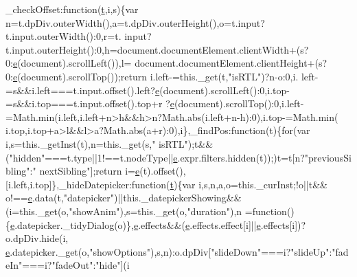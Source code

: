 \begin{DoxyCode}
      \_checkOffset:\textcolor{keyword}{function}(\hyperlink{jquery-2_80_83_8min_8js_aaccc9105df5383111407fd5b41255e23}{t},i,s)\{var n=t.dpDiv.outerWidth(),a=t.dpDiv.outerHeight(),o=t.input?t.input.outerWidth():0,r=t.
      input?t.input.outerHeight():0,h=document.documentElement.clientWidth+(s?0:\hyperlink{jquery-ui_8min_8js_a2c038346d47955cbe2cb91e338edd7e1}{e}(document).scrollLeft()),l=
      document.documentElement.clientHeight+(s?0:\hyperlink{jquery-ui_8min_8js_a2c038346d47955cbe2cb91e338edd7e1}{e}(document).scrollTop());\textcolor{keywordflow}{return} i.left-=this.\_get(t,\textcolor{stringliteral}{"isRTL"})?n-o:0,i.
      left-=s&&i.left===t.input.offset().left?\hyperlink{jquery-ui_8min_8js_a2c038346d47955cbe2cb91e338edd7e1}{e}(document).scrollLeft():0,i.top-=s&&i.top===t.input.offset().top+r
      ?\hyperlink{jquery-ui_8min_8js_a2c038346d47955cbe2cb91e338edd7e1}{e}(document).scrollTop():0,i.left-=Math.min(i.left,i.left+n>h&&h>n?Math.abs(i.left+n-h):0),i.top-=Math.min(
      i.top,i.top+a>l&&l>a?Math.abs(a+r):0),i\},\_findPos:\textcolor{keyword}{function}(t)\{\textcolor{keywordflow}{for}(var i,s=this.\_getInst(t),n=this.\_get(s,\textcolor{stringliteral}{"
      isRTL"});t&&(\textcolor{stringliteral}{"hidden"}===t.type||1!==t.nodeType||\hyperlink{jquery-ui_8min_8js_a2c038346d47955cbe2cb91e338edd7e1}{e}.expr.filters.hidden(t));)t=t[n?\textcolor{stringliteral}{"previousSibling"}:\textcolor{stringliteral}{"
      nextSibling"}];\textcolor{keywordflow}{return} i=\hyperlink{jquery-ui_8min_8js_a2c038346d47955cbe2cb91e338edd7e1}{e}(t).offset(),[i.left,i.top]\},\_hideDatepicker:\textcolor{keyword}{function}(\hyperlink{jquery-2_80_83_8min_8js_aaccc9105df5383111407fd5b41255e23}{t})\{var i,s,n,a,o=this.\_curInst;!o||t&&
      o!==\hyperlink{jquery-ui_8min_8js_a2c038346d47955cbe2cb91e338edd7e1}{e}.data(t,\textcolor{stringliteral}{"datepicker"})||this.\_datepickerShowing&&(i=this.\_get(o,\textcolor{stringliteral}{"showAnim"}),s=this.\_get(o,\textcolor{stringliteral}{"duration"}),n
      =\textcolor{keyword}{function}()\{\hyperlink{jquery-ui_8min_8js_a2c038346d47955cbe2cb91e338edd7e1}{e}.datepicker.\_tidyDialog(o)\},\hyperlink{jquery-ui_8min_8js_a2c038346d47955cbe2cb91e338edd7e1}{e}.effects&&(\hyperlink{jquery-ui_8min_8js_a2c038346d47955cbe2cb91e338edd7e1}{e}.effects.effect[i]||\hyperlink{jquery-ui_8min_8js_a2c038346d47955cbe2cb91e338edd7e1}{e}.effects[i])?o.dpDiv.hide(i,
      \hyperlink{jquery-ui_8min_8js_a2c038346d47955cbe2cb91e338edd7e1}{e}.datepicker.\_get(o,\textcolor{stringliteral}{"showOptions"}),s,n):o.dpDiv[\textcolor{stringliteral}{"slideDown"}===i?\textcolor{stringliteral}{"slideUp"}:\textcolor{stringliteral}{"fadeIn"}===i?\textcolor{stringliteral}{"fadeOut"}:\textcolor{stringliteral}{"hide"}](i

\end{DoxyCode}
